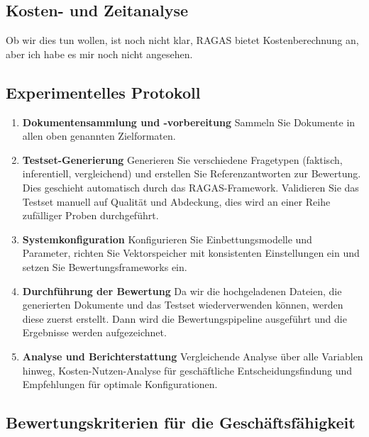 \subsection{Kosten- und Zeitanalyse}
Ob wir dies tun wollen, ist noch nicht klar, RAGAS bietet Kostenberechnung an, aber ich habe es mir noch nicht angesehen.

\subsection{Experimentelles Protokoll}

\begin{enumerate}
    \item \textbf{Dokumentensammlung und -vorbereitung}
    Sammeln Sie Dokumente in allen oben genannten Zielformaten.
    
    \item \textbf{Testset-Generierung}
    Generieren Sie verschiedene Fragetypen (faktisch, inferentiell, vergleichend) und erstellen Sie Referenzantworten zur Bewertung.
    Dies geschieht automatisch durch das RAGAS-Framework.
    Validieren Sie das Testset manuell auf Qualität und Abdeckung, dies wird an einer Reihe zufälliger Proben durchgeführt.
    
    
    \item \textbf{Systemkonfiguration}
    Konfigurieren Sie Einbettungsmodelle und Parameter, richten Sie Vektorspeicher mit konsistenten Einstellungen ein und setzen Sie Bewertungsframeworks ein.
    
    \item \textbf{Durchführung der Bewertung}
    Da wir die hochgeladenen Dateien, die generierten Dokumente und das Testset wiederverwenden können, werden diese zuerst erstellt.
    Dann wird die Bewertungspipeline ausgeführt und die Ergebnisse werden aufgezeichnet.
    
    \item \textbf{Analyse und Berichterstattung}
    Vergleichende Analyse über alle Variablen hinweg, Kosten-Nutzen-Analyse für geschäftliche Entscheidungsfindung und Empfehlungen für optimale Konfigurationen.
\end{enumerate}

\subsection{Bewertungskriterien für die Geschäftsfähigkeit}

